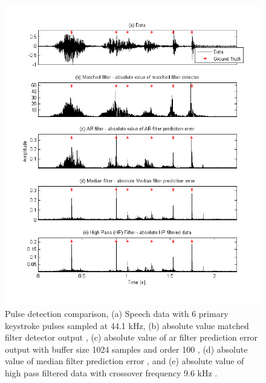 \begin{figure}[!] %
\centering
\includegraphics[width=130mm]{LitRev_DetectCompareNew.png}
\caption{Pulse detection comparison, (a) Speech data with 6 primary keystroke pulses sampled at 44.1 kHz, (b) absolute value matched filter detector output \cite{Vaseghi1988}, (c) absolute value of \gls{ar} filter prediction error output with buffer size 1024 samples and order 100 \cite{Vaseghi1990}, (d) absolute value of median filter prediction error \cite{Tukey1974}, and (e) absolute value of high pass filtered data with crossover frequency 9.6 kHz \cite{Godsill1998book}\cite{Kasparis1993}\cite{US6795559}.}
\label{fig:LitRev_DetectCompare}
\end{figure}

